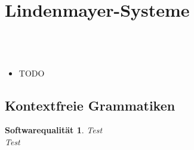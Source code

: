 
\newpage
\slidetitle{}
\section{Lindenmayer-Systeme}

\subsection{ \\}

\begin{itemize}
	\item TODO\\
	
\end{itemize}

\newpage
{}

\subsection{Kontextfreie Grammatiken\\ }

\vspace*{\fill}
\begin{center}
\end{center}
\vfill

\newpage
{}

\newtheorem{defSoftwareQualitaet}{Softwarequalität}[section]
\begin{defSoftwareQualitaet}
	Test \\
	Test
\end{defSoftwareQualitaet}


